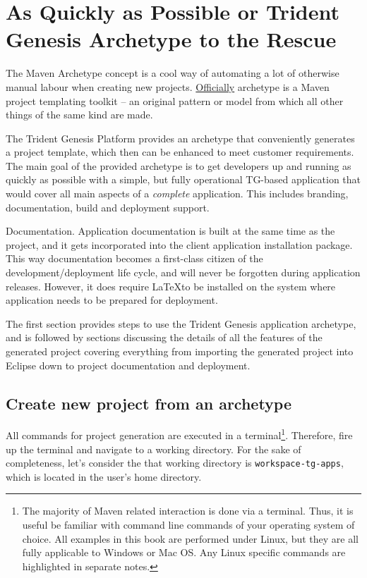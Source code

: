 \chapter{As Quickly as Possible or Trident Genesis Archetype to the Rescue}\label{ch00:02}

  The Maven Archetype concept is a cool way of automating a lot of otherwise manual labour when creating new projects.
  \href{http://maven.apache.org/guides/introduction/introduction-to-archetypes.html}{Officially} archetype is a Maven project templating toolkit -- an original pattern or model from which all other things of the same kind are made.

  The Trident Genesis Platform provides an archetype that conveniently generates a project template, which then can be enhanced to meet customer requirements.
  The main goal of the provided archetype is to get developers up and running as quickly as possible with a simple, but fully operational TG-based application that would cover all main aspects of a \emph{complete} application.
  This includes branding, documentation, build and deployment support.
  
  \begin{notebox}{Documentation.}{\label{mb:documentation-during-build}}
    Application documentation is built at the same time as the project, and it gets incorporated into the client application installation package.
    This way documentation becomes a first-class citizen of the development/deployment life cycle, and will never be forgotten during application releases.
    However, it does require \LaTeX to be installed on the system where application needs to be prepared for deployment.
  \end{notebox}

  The first section provides steps to use the Trident Genesis application archetype, and is followed by sections discussing the details of all the features of the generated project covering everything from importing the generated project into Eclipse down to project documentation and deployment.

\section{Create new project from an archetype}

  All commands for project generation are executed in a terminal\footnote{The majority of Maven related interaction is done via a terminal.
  Thus, it is useful be familiar with command line commands of your operating system of choice.
  All examples in this book are performed under Linux, but they are all fully applicable to Windows or Mac OS.
  Any Linux specific commands are highlighted in separate notes.}.
  Therefore, fire up the terminal and navigate to a working directory.
  For the sake of completeness, let's consider the that working directory is \texttt{workspace-tg-apps}, which is located in the user's home directory.
  

